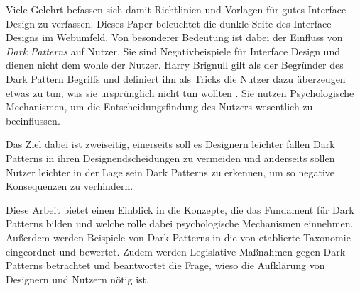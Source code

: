 \documentclass[conference,compsoc,final,a4paper]{IEEEtran}
\begin{document}
Viele Gelehrt befassen sich damit Richtlinien und Vorlagen für gutes Interface Design zu verfassen. Dieses Paper beleuchtet die dunkle Seite des Interface Designs im Webumfeld. Von besonderer Bedeutung ist dabei der Einfluss von \textit{Dark Patterns} auf Nutzer. Sie sind Negativbeispiele für Interface Design und dienen nicht dem wohle der Nutzer. Harry Brignull gilt als der Begründer des Dark Pattern Begriffs und definiert ihn als Tricks die Nutzer dazu überzeugen etwas zu tun, was sie ursprünglich nicht tun wollten \autocite{Brignull}. Sie nutzen Psychologische Mechanismen, um die Entscheidungsfindung des Nutzers wesentlich zu beeinflussen.

Das Ziel dabei ist zweiseitig, einerseits soll es Designern leichter fallen Dark Patterns in ihren Designendscheidungen zu vermeiden und anderseits sollen Nutzer leichter in der Lage sein Dark Patterns zu erkennen, um so negative Konsequenzen zu verhindern. 

Diese Arbeit bietet einen Einblick in die Konzepte, die das Fundament für Dark Patterns bilden und welche rolle dabei psychologische Mechanismen einnehmen. Außerdem werden Beispiele von Dark Patterns in die von \citeauthor{Gray_2018} etablierte Taxonomie eingeordnet und bewertet. Zudem werden Legislative Maßnahmen gegen Dark Patterns betrachtet und beantwortet die Frage, wieso die Aufklärung von Designern und Nutzern nötig ist.

\end{document}
